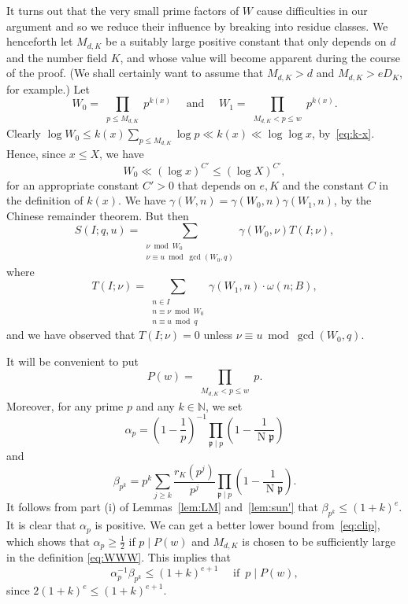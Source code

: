 \documentclass[11pt,letterpaper]{amsart}
\renewcommand{\leq}{\leqslant}
\renewcommand{\geq}{\geqslant}
\theoremstyle{definition}
\numberwithin{equation}{section}
\newcommand\NN{\mathbb{N}}
\DeclareMathOperator{\n}{N}
\newcommand{\fp}{\mathfrak{p}}
\newcommand{\0}{\mathbf{0}}
\begin{document}
It turns out that the very small prime factors of $W$  cause difficulties in our argument and so we reduce  their influence by breaking into residue classes. 
We henceforth let 
$
M_{d,K}
$
be a suitably large positive constant that only depends on $d$ and the number field $K$, and whose value will become apparent during the course of the proof. (We shall certainly want to assume that $M_{d,K}>d$ and $M_{d,K}>eD_K$, for example.)
Let  
\begin{equation}\label{eq:WWW}
W_0=\prod_{\substack{p\leq M_{d,K} }} p^{k(x)} \quad \text{ and } \quad 
W_1=\prod_{\substack{M_{d,K}<p\leq w }}p^{k(x)} .
\end{equation}
Clearly $\log W_0\leq k(x)\sum_{p\leq M_{d,K}}\log p\ll  k(x)\ll \log\log x$, by~\eqref{eq:k-x}.
Hence, since $x\leq X$, we have  
\begin{equation}\label{eq:W0}
W_0\ll (\log x)^{C'}\leq (\log X)^{C'},
\end{equation}
for an appropriate constant $C'>0$ that depends on $e,K$ and the constant $C$ in the definition of $k(x)$.
We have   $\gamma(W,n)=\gamma(W_0,n)\gamma(W_1,n)$, by the Chinese remainder theorem. But then 
\begin{equation}\label{eq:S-to-T}
S(I;q,u)=
\sum_{\substack{\nu \bmod{W_0}\\
\nu\equiv u \bmod{\gcd(W_0,q)}
}} \gamma(W_0,\nu)T(I;\nu),
\end{equation}
where
$$
T(I;\nu)=
\sum_{\substack{n\in I 
\\ n\equiv \nu\bmod{W_0}\\
n\equiv u\bmod q}}\gamma(W_1,n) \cdot \omega(n;B),
$$
and we have observed that $T(I;\nu)=0$  unless $\nu\equiv u \bmod{\gcd(W_0,q)}$. 


It will  be convenient to put
$$
P(w)=\prod_{\substack{M_{d,K}<p\leq w}} p.
$$
Moreover, for any prime $p$ and any $k\in \NN$, we set
\begin{equation}\label{eq:alpha-p}
\alpha_p=\left(1-\frac{1}{p}\right)^{-1}\prod_{\fp\mid p} \left(1-\frac{1}{\n \fp}\right)
\end{equation}
and 
\begin{equation}\label{eq:beta-p}
\beta_{p^k}=p^k\sum_{j\geq k} \frac{r_K(p^j)}{p^j}\prod_{\fp\mid p} \left(1-\frac{1}{\n \fp}\right).
\end{equation}
It follows from part (i) of Lemmas~\ref{lem:LM} and~\ref{lem:sun'} that $\beta_{p^k}\leq (1+k)^e$.
It is clear that $\alpha_p$ is positive. 
We can get a better lower  bound from~\eqref{eq:clip}, which shows that 
$\alpha_p\geq \frac{1}{2}$ if $p\mid P(w)$ and $M_{d,K}$ is chosen to be sufficiently large in  the definition
\eqref{eq:WWW}. 
This implies that 
\begin{equation}\label{eq:beta-bound'}
\alpha_p^{-1}\beta_{p^k}
\leq (1+k)^{e+1} \quad \text{ if }\, p\mid P(w),
\end{equation}
since $2(1+k)^e\leq (1+k)^{e+1}$.
\end{document}
